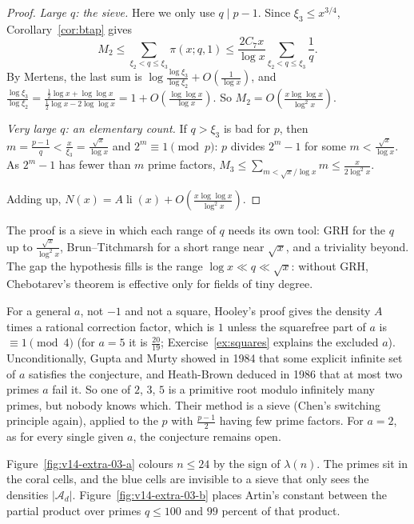 \begin{proof}
\emph{Large $q$: the sieve.} Here we only use $q\mid p-1$. Since $\xi_3\le x^{3/4}$, Corollary~\ref{cor:btap} gives
\[
M_2\le\sum_{\xi_2<q\le\xi_3}\pi(x;q,1)\le\frac{2C_7x}{\log x}\sum_{\xi_2<q\le\xi_3}\frac1q.
\]
By Mertens, the last sum is $\log\frac{\log\xi_3}{\log\xi_2}+O(\frac1{\log x})$, and $\frac{\log\xi_3}{\log\xi_2}=\frac{\frac12\log x+\log\log x}{\frac12\log x-2\log\log x}=1+O(\frac{\log\log x}{\log x})$. So $M_2=O(\frac{x\log\log x}{\log^2x})$.

\emph{Very large $q$: an elementary count.} If $q>\xi_3$ is bad for $p$, then $m=\frac{p-1}q<\frac x{\xi_3}=\frac{\sqrt x}{\log x}$ and $2^m\equiv1\pmod p$: $p$ divides $2^m-1$ for some $m<\frac{\sqrt x}{\log x}$. As $2^m-1$ has fewer than $m$ prime factors, $M_3\le\sum_{m<\sqrt x/\log x}m\le\frac x{2\log^2x}$.

Adding up, $N(x)=A\operatorname{li}(x)+O(\frac{x\log\log x}{\log^2x})$.
\end{proof}

The proof is a sieve in which each range of $q$ needs its own tool: GRH for the $q$ up to $\frac{\sqrt x}{\log^2x}$, Brun--Titchmarsh for a short range near $\sqrt x$, and a triviality beyond. The gap the hypothesis fills is the range $\log x\ll q\ll\sqrt x$: without GRH, Chebotarev's theorem is effective only for fields of tiny degree.

\begin{remark}
For a general $a$, not $-1$ and not a square, Hooley's proof gives the density $A$ times a rational correction factor, which is $1$ unless the squarefree part of $a$ is $\equiv1\pmod4$ (for $a=5$ it is $\frac{20}{19}$; Exercise~\ref{ex:squares} explains the excluded $a$). Unconditionally, Gupta and Murty showed in 1984 that some explicit infinite set of $a$ satisfies the conjecture, and Heath-Brown deduced in 1986 that at most two primes $a$ fail it. So one of $2$, $3$, $5$ is a primitive root modulo infinitely many primes, but nobody knows which. Their method is a sieve (Chen's switching principle again), applied to the $p$ with $\frac{p-1}2$ having few prime factors. For $a=2$, as for every single given $a$, the conjecture remains open.
\end{remark}

Figure~\ref{fig:v14-extra-03-a} colours $n\le24$ by the sign of $\lambda(n)$. The primes sit in the coral cells, and the blue cells are invisible to a sieve that only sees the densities $|\mathcal A_d|$. Figure~\ref{fig:v14-extra-03-b} places Artin's constant between the partial product over primes $q\le100$ and $99$ percent of that product.

